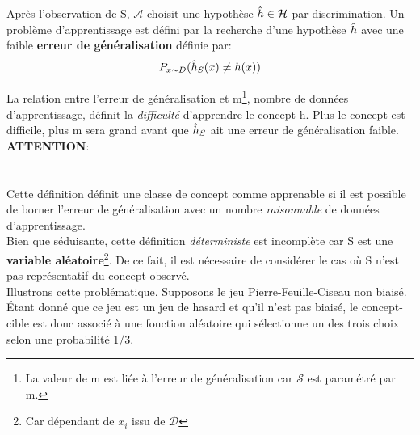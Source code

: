 \noindent Après l'observation de S, $\mathcal{A}$ choisit une hypothèse $\Hat{h} \in \mathcal{H}$ par discrimination. Un problème d'apprentissage est défini par la recherche d'une hypothèse $\Hat{h}$ avec une faible \textbf{erreur de généralisation} définie par:
$$P_{x \sim D} (\Hat{h}_S(x) \neq h(x))$$

\noindent La relation entre l'erreur de généralisation et m\footnote{La valeur de m est liée à l'erreur de généralisation car $\mathcal{S}$ est paramétré par m.}, nombre de données d'apprentissage, définit la \textit{difficulté} d'apprendre le concept h. Plus le concept est difficile, plus m sera grand avant que $\Hat{h}_S$ ait une erreur de généralisation faible.\\

\noindent \textbf{ATTENTION}:\\

\\
\\

\noindent Cette définition définit une classe de concept comme apprenable si il est possible de borner l'erreur de généralisation avec un nombre \textit{raisonnable} de données d'apprentissage.\\

\noindent Bien que séduisante, cette définition \textit{déterministe} est incomplète car S est une \textbf{variable aléatoire}\footnote{Car dépendant de $x_i$ issu de $\mathcal{D}$}. De ce fait, il est nécessaire de considérer le cas où S n'est pas représentatif du concept observé.\\

\noindent Illustrons cette problématique. Supposons le jeu Pierre-Feuille-Ciseau non biaisé. Étant donné que ce jeu est un jeu de hasard et qu'il n'est pas biaisé, le concept-cible est donc associé à une fonction aléatoire qui sélectionne un des trois choix selon une probabilité 1/3.\\

